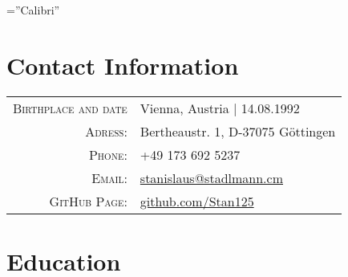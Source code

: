 \documentclass[a4paper,10pt]{article} %
\begin{document}
\pagestyle{empty} %

\font\fb=''Calibri'' %


\par{\bigskip\par} %

\section{Contact Information}

\begin{tabular}{rl}
\textsc{Birthplace and date} & Vienna, Austria  | 14.08.1992 \\
\textsc{Adress:} & Bertheaustr. 1, D-37075 Göttingen \\
\textsc{Phone:} & +49 173 692 5237\\
\textsc{Email:} & \href{mailto:stanislaus@stadlmann.cm}{stanislaus@stadlmann.cm} \\
\textsc{GitHub Page:} & \href{https://github.com/Stan125}{github.com/Stan125}
\end{tabular}


\section{Education}

\end{document}
